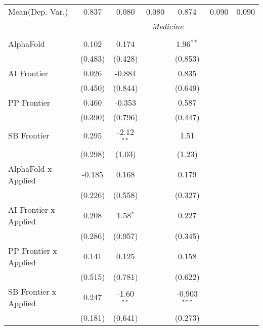 \begin{tabular}{lcccccc}
Mean(Dep. Var.) & 0.837 & 0.080 & 0.080 & 0.874 & 0.090 & 0.090 \\
 & \multicolumn{6}{c}{\textit{Medicine}} \\ \\
   AlphaFold                      & 0.102    & 0.174        &               & 1.96$^{**}$    &        &   \\   
                                  & (0.483)  & (0.428)      &               & (0.853)        &        &   \\   
   AI Frontier                    & 0.026    & -0.884       &               & 0.835          &        &   \\   
                                  & (0.450)  & (0.844)      &               & (0.649)        &        &   \\   
   PP Frontier                    & 0.460    & -0.353       &               & 0.587          &        &   \\   
                                  & (0.390)  & (0.796)      &               & (0.447)        &        &   \\   
   SB Frontier                    & 0.295    & -2.12$^{**}$ &               & 1.51           &        &   \\   
                                  & (0.298)  & (1.03)       &               & (1.23)         &        &   \\   
   AlphaFold x Applied            & -0.185   & 0.168        &               & 0.179          &        &   \\   
                                  & (0.226)  & (0.558)      &               & (0.327)        &        &   \\   
   AI Frontier x Applied          & 0.208    & 1.58$^{*}$   &               & 0.227          &        &   \\   
                                  & (0.286)  & (0.957)      &               & (0.345)        &        &   \\   
   PP Frontier x Applied          & 0.141    & 0.125        &               & 0.158          &        &   \\   
                                  & (0.515)  & (0.781)      &               & (0.622)        &        &   \\   
   SB Frontier x Applied          & 0.247    & -1.60$^{**}$ &               & -0.903$^{***}$ &        &   \\   
                                  & (0.181)  & (0.641)      &               & (0.273)        &        &   \\   

\end{tabular}
